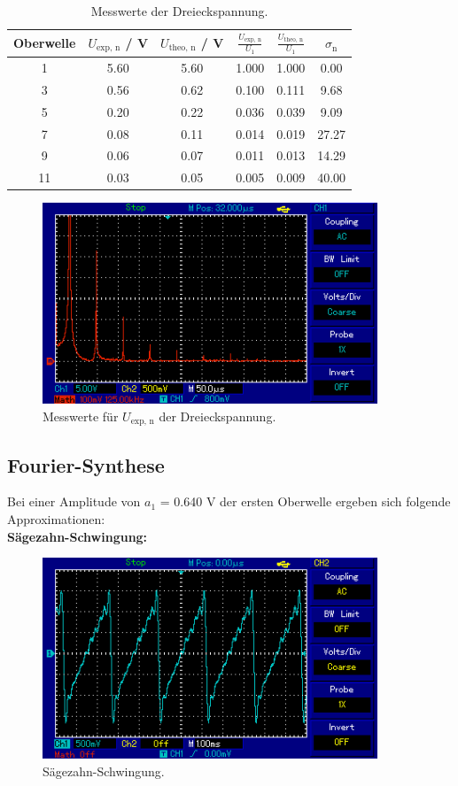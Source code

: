 \begin{table}[H] %
  \centering
  \begin{tabular}{c | c | c | c | c | c}
    \toprule
    Oberwelle & $U_\text{exp, n}$ / V & $U_\text{theo, n}$ / V & $\frac{U_\text{exp, n}}{U_1}$ & $\frac{U_\text{theo, n}}{U_1}$ & $\sigma_\text{n}$ \\
    \midrule
    1  & 5.60 & 5.60 & 1.000 & 1.000 & 0.00 \\
    3  & 0.56 & 0.62 & 0.100 & 0.111 & 9.68 \\
    5  & 0.20 & 0.22 & 0.036 & 0.039 & 9.09 \\
    7  & 0.08 & 0.11 & 0.014 & 0.019 & 27.27\\
    9  & 0.06 & 0.07 & 0.011 & 0.013 & 14.29\\
    11 & 0.03 & 0.05 & 0.005 & 0.009 & 40.00\\
    \bottomrule
  \end{tabular}
  \caption{Messwerte der Dreieckspannung.}
  \label{tab:Drei}
\end{table}

\begin{figure}[H]
  \centering
  \includegraphics[height=6cm]{picture/DreieckB.PNG}
  \caption{Messwerte für $U_\text{exp, n}$ der Dreieckspannung.}
  \label{fig:DreieckB}
\end{figure}

\subsection{Fourier-Synthese}
\label{sec:Synthese}
Bei einer Amplitude von $a_1$ = 0.640 V der ersten Oberwelle ergeben sich folgende Approximationen: \\
\textbf{Sägezahn-Schwingung:} \\
\begin{figure}[H]
  \centering
  \includegraphics[height=6cm]{picture/Saege.PNG}
  \caption{Sägezahn-Schwingung.}
  \label{fig:Säge}
\end{figure}

